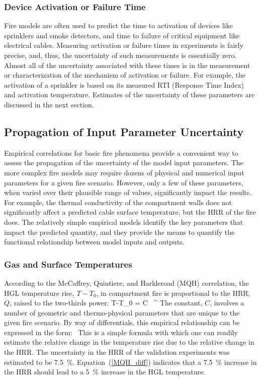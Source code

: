 \subsubsection{Device Activation or Failure Time}

Fire models are often used to predict the time to activation of devices like sprinklers and smoke detectors, and time to failure of critical equipment like electrical cables. Measuring activation or failure times in experiments is fairly precise, and, thus, the uncertainty of such measurements is essentially zero. Almost all of the uncertainty associated with these times is in the measurement or characterization of the mechanism of activation or failure. For example, the activation of a sprinkler is based on its measured RTI (Response Time Index) and activation temperature. Estimates of the uncertainty of these parameters are discussed in the next section.

\subsection{Propagation of Input Parameter Uncertainty}
\label{input_uncertainty}

Empirical correlations for basic fire phenomena provide a convenient way to assess the propagation of the uncertainty of the model input parameters. The more complex fire models may require dozens of physical and numerical input parameters for a given fire scenario.  However, only a few of these parameters, when varied over their plausible range of values, significantly impact the results. For example, the thermal conductivity of the compartment walls does not significantly affect a predicted cable surface temperature, but the HRR of the fire does. The relatively simple empirical models identify the key parameters that impact the predicted quantity, and they provide the means to quantify the functional relationship between model inputs and outputs.

\subsubsection{Gas and Surface Temperatures}

According to the McCaffrey, Quintiere, and Harkleroad (MQH) correlation, the HGL temperature rise, $T-T_0$, in compartment fire is proportional to the HRR, $\dot{Q}$, raised to the two-thirds power:
\be
   T-T_0 = C \, ^{}
\ee
The constant, $C$, involves a number of geometric and thermo-physical parameters that are unique to the given fire scenario. By way of differentials, this empirical relationship can be expressed in the form:
\be
    \approx {} \,  \label{MQH_diff}
\ee
This is a simple formula with which one can readily estimate the relative change in the temperature rise due to the relative change in the HRR. The uncertainty in the HRR of the validation experiments was estimated to be 7.5~\%. Equation~(\ref{MQH_diff}) indicates that a 7.5~\% increase in the HRR should lead to a 5~\% increase in the HGL temperature.

